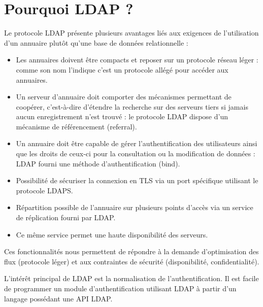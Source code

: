 \documentclass[11pt,fleqn]{report}
\begin{document}
\chapter{Pourquoi LDAP ?}
Le protocole LDAP présente plusieurs avantages liés aux exigences de l’utilisation d’un annuaire plutôt qu’une base de données relationnelle :
\begin{itemize}
\item Les annuaires doivent être compacts et reposer sur un protocole réseau léger : comme son nom l’indique c’est un protocole allégé pour accéder aux annuaires.
\item Un serveur d'annuaire doit comporter des mécanismes permettant de coopérer, c'est-à-dire d'étendre la recherche sur des serveurs tiers si jamais aucun enregistrement n'est trouvé : le protocole LDAP dispose d’un mécanisme de référencement (referral).
\item Un annuaire doit être capable de gérer l'authentification des utilisateurs ainsi que les droits de ceux-ci pour la consultation ou la modification de données : LDAP fourni une méthode d’authentification (bind).
\item Possibilité de sécuriser la connexion en TLS via un port spécifique utilisant le protocole LDAPS.
\item Répartition possible de l’annuaire sur plusieurs points d’accès via un service de réplication fourni par LDAP.
\item Ce même service permet une haute disponibilité des serveurs.
\end{itemize}
Ces fonctionnalités nous permettent de répondre à la demande d'optimisation des flux (protocole léger) et aux contraintes de sécurité (disponibilité, confidentialité).


L'intérêt principal de LDAP est la normalisation de l'authentification. Il est facile de programmer un module d'authentification utilisant LDAP à partir d'un langage possédant une API LDAP.
\end{document}
